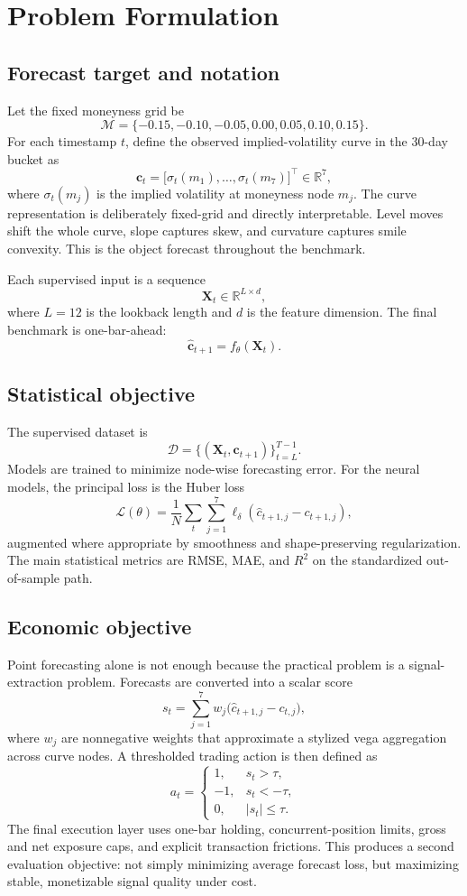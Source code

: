 \documentclass[12pt]{report}
\begin{document}
\chapter{Problem Formulation}

\section{Forecast target and notation}
Let the fixed moneyness grid be
\[
\mathcal{M}=\{-0.15,-0.10,-0.05,0.00,0.05,0.10,0.15\}.
\]
For each timestamp \(t\), define the observed implied-volatility curve in the 30-day bucket as
\[
\mathbf{c}_t=\big[\sigma_t(m_1),\ldots,\sigma_t(m_7)\big]^\top \in \mathbb{R}^7,
\]
where \(\sigma_t(m_j)\) is the implied volatility at moneyness node \(m_j\). The curve representation is deliberately fixed-grid and directly interpretable. Level moves shift the whole curve, slope captures skew, and curvature captures smile convexity. This is the object forecast throughout the benchmark.

Each supervised input is a sequence
\[
\mathbf{X}_t \in \mathbb{R}^{L\times d},
\]
where \(L=12\) is the lookback length and \(d\) is the feature dimension. The final benchmark is one-bar-ahead:
\[
\hat{\mathbf{c}}_{t+1}=f_\theta(\mathbf{X}_t).
\]

\section{Statistical objective}
The supervised dataset is
\[
\mathcal{D}=\{(\mathbf{X}_t,\mathbf{c}_{t+1})\}_{t=L}^{T-1}.
\]
Models are trained to minimize node-wise forecasting error. For the neural models, the principal loss is the Huber loss
\[
\mathcal{L}(\theta)=\frac{1}{N}\sum_t\sum_{j=1}^{7}\ell_\delta\!\left(\hat{c}_{t+1,j}-c_{t+1,j}\right),
\]
augmented where appropriate by smoothness and shape-preserving regularization. The main statistical metrics are RMSE, MAE, and \(R^2\) on the standardized out-of-sample path.

\section{Economic objective}
Point forecasting alone is not enough because the practical problem is a signal-extraction problem. Forecasts are converted into a scalar score
\[
s_t=\sum_{j=1}^{7}w_j\big(\hat{c}_{t+1,j}-c_{t,j}\big),
\]
where \(w_j\) are nonnegative weights that approximate a stylized vega aggregation across curve nodes. A thresholded trading action is then defined as
\[
a_t=
\begin{cases}
1, & s_t>\tau,\\
-1, & s_t<-\tau,\\
0, & |s_t|\le \tau.
\end{cases}
\]
The final execution layer uses one-bar holding, concurrent-position limits, gross and net exposure caps, and explicit transaction frictions. This produces a second evaluation objective: not simply minimizing average forecast loss, but maximizing stable, monetizable signal quality under cost.
\end{document}
